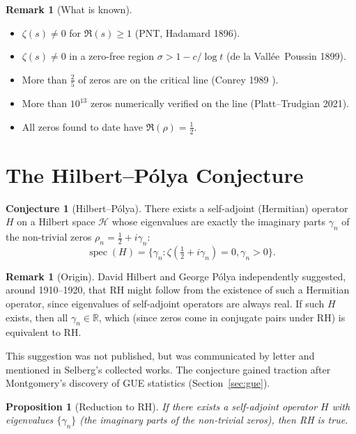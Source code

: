\documentclass[12pt,a4paper]{amsart}
\newtheorem{proposition}[theorem]{Proposition}
\theoremstyle{definition}
\newtheorem{remark}[theorem]{Remark}
\newtheorem{conjecture}[theorem]{Conjecture}
\newcommand{\R}{\mathbb{R}}
\DeclareMathOperator{\spec}{spec}
\begin{document}
\begin{remark}[What is known]
\begin{itemize}
  \item $\zeta(s) \ne 0$ for $\Re(s) \ge 1$ (PNT, Hadamard 1896).
  \item $\zeta(s) \ne 0$ in a zero-free region $\sigma > 1 - c/\log t$
    (de la Vall\'ee~Poussin 1899).
  \item More than $\tfrac{2}{5}$ of zeros are on the critical line
    (Conrey 1989 \cite{Conrey1989}).
  \item More than $10^{13}$ zeros numerically verified on the line
    (Platt--Trudgian 2021).
  \item All zeros found to date have $\Re(\rho) = \tfrac{1}{2}$.
\end{itemize}
\end{remark}

\section{The Hilbert--P\'olya Conjecture}

\begin{conjecture}[Hilbert--P\'olya]
\label{conj:hilbert_polya}
There exists a self-adjoint (Hermitian) operator $H$ on a Hilbert space
$\mathcal{H}$ whose eigenvalues are exactly the imaginary parts
$\gamma_n$ of the non-trivial zeros $\rho_n = \tfrac{1}{2} + i\gamma_n$:
\[
  \spec(H) = \{\gamma_n : \zeta(\tfrac{1}{2} + i\gamma_n) = 0, \gamma_n > 0\}.
\]
\end{conjecture}

\begin{remark}[Origin]
David Hilbert and George P\'olya independently suggested, around 1910--1920,
that RH might follow from the existence of such a Hermitian operator,
since eigenvalues of self-adjoint operators are always real.
If such $H$ exists, then all $\gamma_n \in \R$, which (since zeros come in
conjugate pairs under RH) is equivalent to RH.

This suggestion was not published, but was communicated by letter and
mentioned in Selberg's collected works.  The conjecture gained traction
after Montgomery's discovery of GUE statistics (Section~\ref{sec:gue}).
\end{remark}

\begin{proposition}[Reduction to RH]
If there exists a self-adjoint operator $H$ with eigenvalues $\{\gamma_n\}$
(the imaginary parts of the non-trivial zeros), then RH is true.
\end{proposition}
\end{document}
